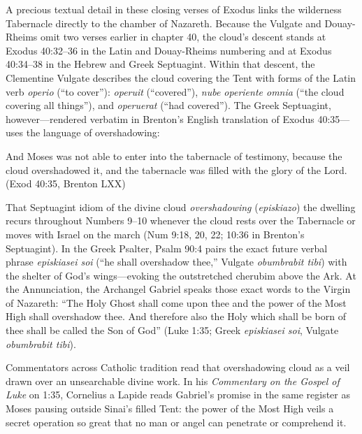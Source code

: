 A precious textual detail in these closing verses of Exodus links the wilderness Tabernacle directly to the chamber of Nazareth. Because the Vulgate and Douay-Rheims omit two verses earlier in chapter 40, the cloud's descent stands at Exodus 40:32--36 in the Latin and Douay-Rheims numbering and at Exodus 40:34--38 in the Hebrew and Greek Septuagint. Within that descent, the Clementine Vulgate describes the cloud covering the Tent with forms of the Latin verb \textit{operio} (``to cover''): \textit{operuit} (``covered''), \textit{nube operiente omnia} (``the cloud covering all things''), and \textit{operuerat} (``had covered''). The Greek Septuagint, however---rendered verbatim in Brenton's English translation of Exodus 40:35---uses the language of overshadowing:

\begin{scriptureblock}
And Moses was not able to enter into the tabernacle of testimony, because the cloud overshadowed it, and the tabernacle was filled with the glory of the Lord. \textnormal{(Exod 40:35, Brenton LXX)}
\end{scriptureblock}

That Septuagint idiom of the divine cloud \textit{overshadowing} (\textit{episkiazo}) the dwelling recurs throughout Numbers 9--10 whenever the cloud rests over the Tabernacle or moves with Israel on the march (Num 9:18, 20, 22; 10:36 in Brenton's Septuagint). In the Greek Psalter, Psalm 90:4 pairs the exact future verbal phrase \textit{episkiasei soi} (``he shall overshadow thee,'' Vulgate \textit{obumbrabit tibi}) with the shelter of God's wings---evoking the outstretched cherubim above the Ark. At the Annunciation, the Archangel Gabriel speaks those exact words to the Virgin of Nazareth: ``The Holy Ghost shall come upon thee and the power of the Most High shall overshadow thee. And therefore also the Holy which shall be born of thee shall be called the Son of God'' (Luke 1:35; Greek \textit{episkiasei soi}, Vulgate \textit{obumbrabit tibi}).

Commentators across Catholic tradition read that overshadowing cloud as a veil drawn over an unsearchable divine work. In his \textit{Commentary on the Gospel of Luke} on 1:35, Cornelius a Lapide reads Gabriel's promise in the same register as Moses pausing outside Sinai's filled Tent: the power of the Most High veils a secret operation so great that no man or angel can penetrate or comprehend it.

